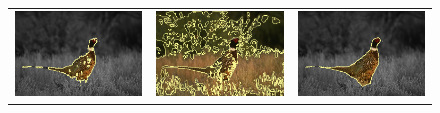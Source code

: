 \documentclass[smallextended]{svjour3}       %
\begin{document}
{{\begin{figure}[hp!]
\begin{tabular}{ccc}
		\includegraphics[scale=0.2]{images/segmentation/bc/bird/gc-seg.png} &
		\includegraphics[scale=0.2]{images/segmentation/schoenemann/bird/bird-seg.png} &
		\includegraphics[scale=0.2]{images/segmentation/bc/bird/corrected-seg.png}\\				

\end{tabular}
\end{figure}}}
\end{document}
